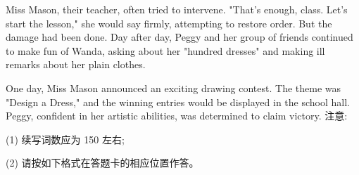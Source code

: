\documentclass{英语试卷}
\begin{document}
\par Miss Mason, their teacher, often tried to intervene. "That's enough, class. Let's start the lesson," she would say firmly, attempting to restore order. But the damage had been done. Day after day, Peggy and her group of friends continued to make fun of Wanda, asking about her "hundred dresses" and making ill remarks about her plain clothes.\par
\par One day, Miss Mason announced an exciting drawing contest. The theme was "Design a Dress," and the winning entries would be displayed in the school hall. Peggy, confident in her artistic abilities, was determined to claim victory. 注意:\par
\par (1) 续写词数应为 150 左右;\par
\par (2) 请按如下格式在答题卡的相应位置作答。\par
{}
\end{document}
